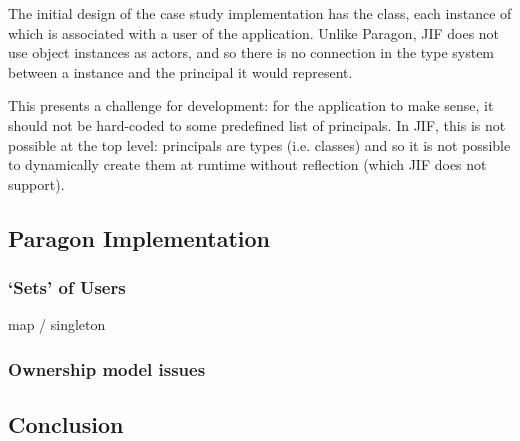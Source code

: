 The initial design of the case study implementation has the  class, each instance of which is associated with a user of the application. Unlike Paragon, JIF does not use object instances as actors, and so there is no connection in the type system between a  instance and the principal it would represent.

This presents a challenge for development: for the application to make sense, it should not be hard-coded to some predefined list of principals. In JIF, this is not possible at the top level: principals are types (i.e. classes) and so it is not possible to dynamically create them at runtime without reflection (which JIF does not support).

\cite{hicks2007jifclipse}

\subsection{Paragon Implementation}

\subsubsection{`Sets' of Users}

map / singleton

\subsubsection{Ownership model issues}

\subsection{Conclusion}